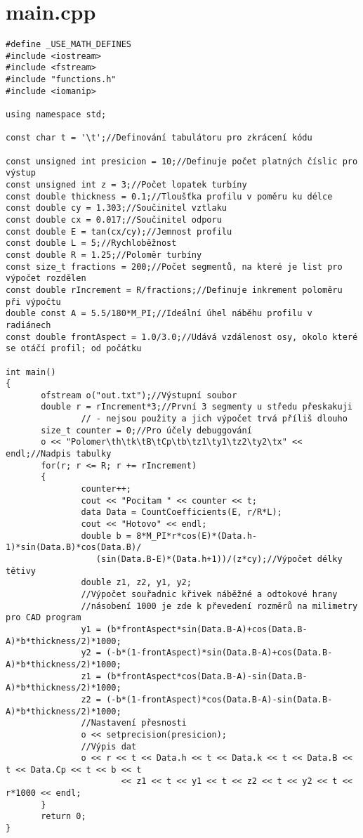 \section{main.cpp}
\begin{mylisting}
\begin{verbatim}
#define _USE_MATH_DEFINES
#include <iostream>
#include <fstream>
#include "functions.h"
#include <iomanip>

using namespace std;

const char t = '\t';//Definování tabulátoru pro zkrácení kódu

const unsigned int presicion = 10;//Definuje počet platných číslic pro výstup
const unsigned int z = 3;//Počet lopatek turbíny
const double thickness = 0.1;//Tloušťka profilu v poměru ku délce
const double cy = 1.303;//Součinitel vztlaku
const double cx = 0.017;//Součinitel odporu
const double E = tan(cx/cy);//Jemnost profilu
const double L = 5;//Rychloběžnost
const double R = 1.25;//Poloměr turbíny
const size_t fractions = 200;//Počet segmentů, na které je list pro výpočet rozdělen
const double rIncrement = R/fractions;//Definuje inkrement poloměru při výpočtu
double const A = 5.5/180*M_PI;//Ideální úhel náběhu profilu v radiánech
const double frontAspect = 1.0/3.0;//Udává vzdálenost osy, okolo které se otáčí profil; od počátku

int main()
{
       ofstream o("out.txt");//Výstupní soubor
       double r = rIncrement*3;//První 3 segmenty u středu přeskakuji
               // - nejsou použity a jich výpočet trvá příliš dlouho
       size_t counter = 0;//Pro účely debuggování
       o << "Polomer\th\tk\tB\tCp\tb\tz1\ty1\tz2\ty2\tx" << endl;//Nadpis tabulky
       for(r; r <= R; r += rIncrement)
       {
               counter++;
               cout << "Pocitam " << counter << t;
               data Data = CountCoefficients(E, r/R*L);
               cout << "Hotovo" << endl;
               double b = 8*M_PI*r*cos(E)*(Data.h-1)*sin(Data.B)*cos(Data.B)/
                  (sin(Data.B-E)*(Data.h+1))/(z*cy);//Výpočet délky tětivy
               double z1, z2, y1, y2;
               //Výpočet souřadnic křivek náběžné a odtokové hrany
               //násobení 1000 je zde k převedení rozměrů na milimetry pro CAD program
               y1 = (b*frontAspect*sin(Data.B-A)+cos(Data.B-A)*b*thickness/2)*1000;
               y2 = (-b*(1-frontAspect)*sin(Data.B-A)+cos(Data.B-A)*b*thickness/2)*1000;
               z1 = (b*frontAspect*cos(Data.B-A)-sin(Data.B-A)*b*thickness/2)*1000;
               z2 = (-b*(1-frontAspect)*cos(Data.B-A)-sin(Data.B-A)*b*thickness/2)*1000;
               //Nastavení přesnosti
               o << setprecision(presicion);
               //Výpis dat
               o << r << t << Data.h << t << Data.k << t << Data.B << t << Data.Cp << t << b << t
                       << z1 << t << y1 << t << z2 << t << y2 << t << r*1000 << endl;
       }
       return 0;
}

\end{verbatim}
\end{mylisting}


